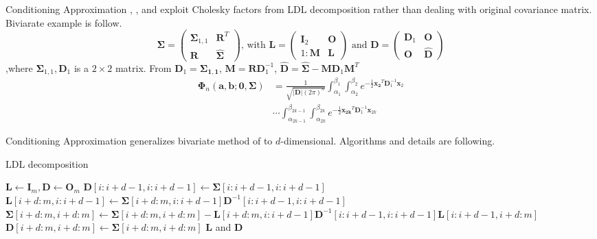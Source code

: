 \begin{frame}{Conditioning Approximation}
\footnotesize
\citet{mendell1974multifactorial}, \citet{kamakura1989estimation}, and \citet{trinh2015bivariate} exploit Cholesky factors from LDL decomposition rather than dealing with original covariance matrix.
Biviarate example is follow.
$$\boldsymbol{\Sigma} = \begin{pmatrix}
\boldsymbol{\Sigma}_{1,1} & \mathbf{R}^T\\
\mathbf{R} & \hat{\boldsymbol{\Sigma}}
\end{pmatrix}\text{, with } \mathbf{L}=\begin{pmatrix}
\mathbf{I}_{2} & \mathbf{O}\\1:
\mathbf{M} & \mathbf{L}
\end{pmatrix}\text{ and } \mathbf{D}=\begin{pmatrix}
\mathbf{D}_{1} & \mathbf{O}\\
\mathbf{O} & \mathbf{\hat{D}}
\end{pmatrix}$$
,where $\boldsymbol{\Sigma}_{1,1}, \mathbf{D}_{1}$ is a $2\times2$ matrix. From $\mathbf{D}_1=\boldsymbol{\Sigma_{1,1}}$, $\mathbf{M}=\mathbf{R}\mathbf{D}_1^{-1}$, $\mathbf{\hat{D}}=\hat{\boldsymbol{\Sigma}}-\mathbf{M}\mathbf{D}_1\mathbf{M}^T$
\begin{align}\label{eqn:phi_cond-biv}
\boldsymbol{\Phi}_n(\mathbf{a},\mathbf{b};\mathbf{0},\boldsymbol{\Sigma})
&= \frac{1}{\sqrt{\lvert\mathbf{D}\rvert(2\pi)^n}}\int_{\alpha_1}^{\beta_1}\int_{\alpha_2}^{\beta_2}e^{-\frac{1}{2}\mathbf{x_2}^T\mathbf{D}_1^{-1}\mathbf{x}_2}\nonumber\\
&\cdots \int_{\alpha_{2k-1}}^{\beta_{2k-1}}\int_{\alpha_{2k}}^{\beta_{2k}}e^{-\frac{1}{2}\mathbf{x_{2k}}^T\mathbf{D}_1^{-1}\mathbf{x}_{2k}}
\end{align}
\end{frame}

\begin{frame}{Conditioning Approximation}
\citet{cao2019hierarchical} generalizes bivariate method of \citet{trinh2015bivariate} to $d$-dimensional. Algorithms and details are following.
\begin{algorithm}[H]
	\caption{LDL decomposition}
	\begin{algorithmic}[1]
		\tiny
		\State $\mathbf{L} \leftarrow \mathbf{I}_m, \mathbf{D} \leftarrow \mathbf{O}_m$
		\State $\mathbf{D}[i:i+d-1,i:i+d-1] \leftarrow \boldsymbol{\Sigma}[i:i+d-1,i:i+d-1]$
		\State $\mathbf{L}[i+d:m,i:i+d-1] \leftarrow \boldsymbol{\Sigma}[i+d:m,i:i+d-1]\mathbf{D}^{-1}[i:i+d-1,i:i+d-1]$
		\State $\boldsymbol{\Sigma}[i+d:m,i+d:m]\leftarrow\boldsymbol{\Sigma}[i+d:m,i+d:m]-\mathbf{L}[i+d:m,i:i+d-1] \mathbf{D}^{-1}[i:i+d-1,i:i+d-1] \mathbf{L}[i:i+d-1,i+d:m]$
		\State $\mathbf{D}[i+d:m,i+d:m] \leftarrow \boldsymbol{\Sigma}[i+d:m,i+d:m]$
		\EndIf
		\EndFor
		\State\Return $\mathbf{L}$ and $\mathbf{D}$
		\EndProcedure
	\end{algorithmic}\label{alg:LDL-d}
\end{algorithm}
\end{frame}

